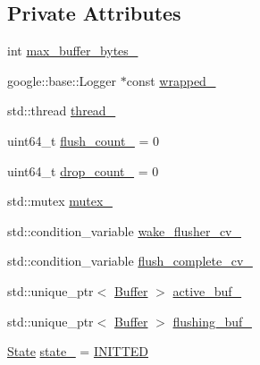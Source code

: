 \subsection*{Private Attributes}
\begin{DoxyCompactItemize}
\item 
int \hyperlink{classapollo_1_1cyber_1_1logger_1_1AsyncLogger_aa335015aac6cf1e4a7ef9def98cc5f33}{max\-\_\-buffer\-\_\-bytes\-\_\-}
\item 
google\-::base\-::\-Logger $\ast$const \hyperlink{classapollo_1_1cyber_1_1logger_1_1AsyncLogger_a4d7679337ba167a45f75c006f9c2f340}{wrapped\-\_\-}
\item 
std\-::thread \hyperlink{classapollo_1_1cyber_1_1logger_1_1AsyncLogger_a973fb1d166acaab52815ded79cadec25}{thread\-\_\-}
\item 
uint64\-\_\-t \hyperlink{classapollo_1_1cyber_1_1logger_1_1AsyncLogger_a52a5941a5ed779bac9b1469677dfd8fa}{flush\-\_\-count\-\_\-} = 0
\item 
uint64\-\_\-t \hyperlink{classapollo_1_1cyber_1_1logger_1_1AsyncLogger_ae50ea372dfdfe32615dc5d25664c8075}{drop\-\_\-count\-\_\-} = 0
\item 
std\-::mutex \hyperlink{classapollo_1_1cyber_1_1logger_1_1AsyncLogger_a822d34060bc2e4bc3c1b5dbb80a62470}{mutex\-\_\-}
\item 
std\-::condition\-\_\-variable \hyperlink{classapollo_1_1cyber_1_1logger_1_1AsyncLogger_a606516963229bb28e70cf5599e993798}{wake\-\_\-flusher\-\_\-cv\-\_\-}
\item 
std\-::condition\-\_\-variable \hyperlink{classapollo_1_1cyber_1_1logger_1_1AsyncLogger_ac317fa7ba8ac170fcaebee103b861aa6}{flush\-\_\-complete\-\_\-cv\-\_\-}
\item 
std\-::unique\-\_\-ptr$<$ \hyperlink{structapollo_1_1cyber_1_1logger_1_1AsyncLogger_1_1Buffer}{Buffer} $>$ \hyperlink{classapollo_1_1cyber_1_1logger_1_1AsyncLogger_a89a6be9354f86ddcfabe1d313117b43d}{active\-\_\-buf\-\_\-}
\item 
std\-::unique\-\_\-ptr$<$ \hyperlink{structapollo_1_1cyber_1_1logger_1_1AsyncLogger_1_1Buffer}{Buffer} $>$ \hyperlink{classapollo_1_1cyber_1_1logger_1_1AsyncLogger_ae78d3263cf93ea38811ab00e2afc6d1c}{flushing\-\_\-buf\-\_\-}
\item 
\hyperlink{classapollo_1_1cyber_1_1logger_1_1AsyncLogger_ac693c5c55875861feb508ed2b60223a4}{State} \hyperlink{classapollo_1_1cyber_1_1logger_1_1AsyncLogger_a01dbb42c36800aa824b929ddba8332d8}{state\-\_\-} = \hyperlink{classapollo_1_1cyber_1_1logger_1_1AsyncLogger_ac693c5c55875861feb508ed2b60223a4a05e01a42de2ef2f76fc008c2f2ac0b11}{I\-N\-I\-T\-T\-E\-D}
\end{DoxyCompactItemize}


